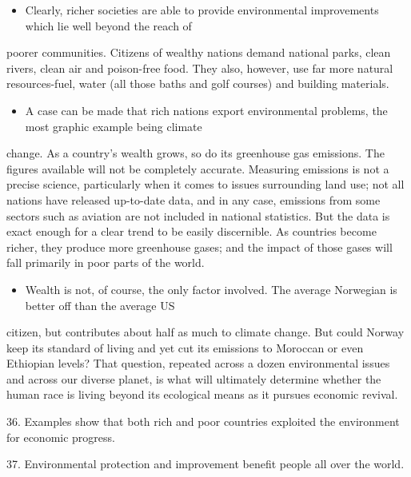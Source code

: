 \documentclass[UTF8,11pt]{ctexart}
\begin{document}
\begin{itemize}[leftmargin=2em,itemsep=.2em,topsep=.4em]\item[M.] Clearly, richer societies are able to provide environmental improvements which lie well beyond the reach of
\end{itemize}

poorer communities. Citizens of wealthy nations demand national parks, clean rivers, clean air and poison-free food. They also, however, use far more natural resources-fuel, water (all those baths and golf courses) and building materials.


\begin{itemize}[leftmargin=2em,itemsep=.2em,topsep=.4em]\item[N.] A case can be made that rich nations export environmental problems, the most graphic example being climate
\end{itemize}

change. As a country’s wealth grows, so do its greenhouse gas emissions. The figures available will not be completely accurate. Measuring emissions is not a precise science, particularly when it comes to issues surrounding land use; not all nations have released up-to-date data, and in any case, emissions from some sectors such as aviation are not included in national statistics. But the data is exact enough for a clear trend to be easily discernible. As countries become richer, they produce more greenhouse gases; and the impact of those gases will fall primarily in poor parts of the world.


\begin{itemize}[leftmargin=2em,itemsep=.2em,topsep=.4em]\item[O.] Wealth is not, of course, the only factor involved. The average Norwegian is better off than the average US
\end{itemize}

citizen, but contributes about half as much to climate change. But could Norway keep its standard of living and yet cut its emissions to Moroccan or even Ethiopian levels? That question, repeated across a dozen environmental issues and across our diverse planet, is what will ultimately determine whether the human race is living beyond its ecological means as it pursues economic revival.


36. Examples show that both rich and poor countries exploited the environment for economic progress.


37. Environmental protection and improvement benefit people all over the world.
\end{document}

